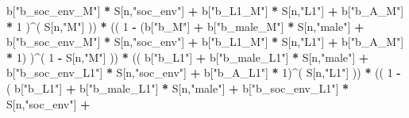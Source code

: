 \documentclass[
]{book}
\newenvironment{Shaded}{\begin{snugshade}}{\end{snugshade}}
\newcommand{\DecValTok}[1]{\textcolor[rgb]{0.00,0.00,0.81}{#1}}
\newcommand{\NormalTok}[1]{#1}
\newcommand{\SpecialCharTok}[1]{\textcolor[rgb]{0.81,0.36,0.00}{\textbf{#1}}}
\newcommand{\StringTok}[1]{\textcolor[rgb]{0.31,0.60,0.02}{#1}}
\begin{document}
\begin{Shaded}
\begin{Highlighting}[]
\NormalTok{                             b[}\StringTok{"b\_soc\_env\_M"}\NormalTok{] }\SpecialCharTok{*}\NormalTok{ S[n,}\StringTok{"soc\_env"}\NormalTok{] }\SpecialCharTok{+} 
\NormalTok{                             b[}\StringTok{"b\_L1\_M"}\NormalTok{] }\SpecialCharTok{*}\NormalTok{ S[n,}\StringTok{"L1"}\NormalTok{] }\SpecialCharTok{+}
\NormalTok{                             b[}\StringTok{"b\_A\_M"}\NormalTok{] }\SpecialCharTok{*} \DecValTok{1}\NormalTok{ )}\SpecialCharTok{\^{}}\NormalTok{( S[n,}\StringTok{"M"}\NormalTok{] )) }\SpecialCharTok{*}
\NormalTok{                        (( }\DecValTok{1} \SpecialCharTok{{-}}\NormalTok{ (b[}\StringTok{"b\_M"}\NormalTok{] }\SpecialCharTok{+} 
\NormalTok{                                  b[}\StringTok{"b\_male\_M"}\NormalTok{] }\SpecialCharTok{*}\NormalTok{ S[n,}\StringTok{"male"}\NormalTok{] }\SpecialCharTok{+} 
\NormalTok{                                  b[}\StringTok{"b\_soc\_env\_M"}\NormalTok{] }\SpecialCharTok{*}\NormalTok{ S[n,}\StringTok{"soc\_env"}\NormalTok{] }\SpecialCharTok{+} 
\NormalTok{                                  b[}\StringTok{"b\_L1\_M"}\NormalTok{] }\SpecialCharTok{*}\NormalTok{ S[n,}\StringTok{"L1"}\NormalTok{] }\SpecialCharTok{+}
\NormalTok{                                  b[}\StringTok{"b\_A\_M"}\NormalTok{] }\SpecialCharTok{*} \DecValTok{1}\NormalTok{) )}\SpecialCharTok{\^{}}\NormalTok{( }\DecValTok{1} \SpecialCharTok{{-}}\NormalTok{ S[n,}\StringTok{"M"}\NormalTok{] )) }\SpecialCharTok{*}
\NormalTok{                        (( b[}\StringTok{"b\_L1"}\NormalTok{] }\SpecialCharTok{+}
\NormalTok{                             b[}\StringTok{"b\_male\_L1"}\NormalTok{] }\SpecialCharTok{*}\NormalTok{ S[n,}\StringTok{"male"}\NormalTok{] }\SpecialCharTok{+}  
\NormalTok{                             b[}\StringTok{"b\_soc\_env\_L1"}\NormalTok{] }\SpecialCharTok{*}\NormalTok{ S[n,}\StringTok{"soc\_env"}\NormalTok{] }\SpecialCharTok{+}
\NormalTok{                             b[}\StringTok{"b\_A\_L1"}\NormalTok{] }\SpecialCharTok{*} \DecValTok{1}\NormalTok{)}\SpecialCharTok{\^{}}\NormalTok{( S[n,}\StringTok{"L1"}\NormalTok{] )) }\SpecialCharTok{*}
\NormalTok{                        (( }\DecValTok{1} \SpecialCharTok{{-}}\NormalTok{ ( b[}\StringTok{"b\_L1"}\NormalTok{] }\SpecialCharTok{+}
\NormalTok{                                   b[}\StringTok{"b\_male\_L1"}\NormalTok{] }\SpecialCharTok{*}\NormalTok{ S[n,}\StringTok{"male"}\NormalTok{] }\SpecialCharTok{+}  
\NormalTok{                                   b[}\StringTok{"b\_soc\_env\_L1"}\NormalTok{] }\SpecialCharTok{*}\NormalTok{ S[n,}\StringTok{"soc\_env"}\NormalTok{] }\SpecialCharTok{+}

\end{Highlighting}
\end{Shaded}
\end{document}
